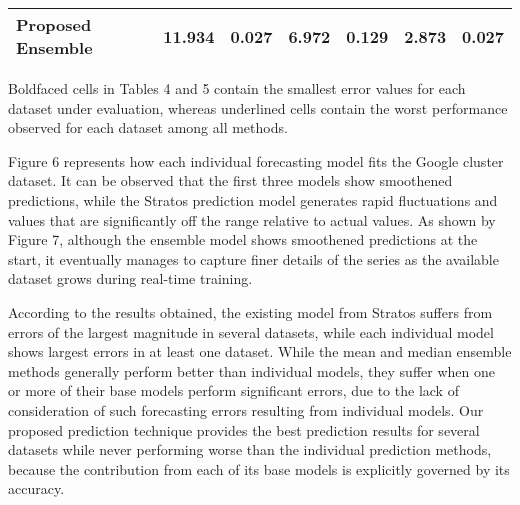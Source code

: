\begin{table}[]
\begin{tabular}{|l|r|r|r|r|r|r|}
Proposed Ensemble                                     & \textbf{11.934}           & \textbf{0.027}            & \textbf{6.972}            & \textbf{0.129}            & 2.873                     & 0.027                     \\ \hline
\end{tabular}
\end{table}

Boldfaced cells in Tables 4 and 5 contain the smallest error values for each dataset under evaluation, whereas underlined cells contain the worst performance observed for each dataset among all methods.

Figure 6 represents how each individual forecasting model fits the Google cluster dataset. It can be observed that the first three models show smoothened predictions, while the Stratos prediction model generates rapid fluctuations and values that are significantly off the range relative to actual values. As shown by Figure 7, although the ensemble model shows smoothened predictions at the start, it eventually manages to capture finer details of the series as the available dataset grows during real-time training.

According to the results obtained, the existing model from Stratos suffers from errors of the largest magnitude in several datasets, while each individual model shows largest errors in at least one dataset.
While the mean and median ensemble methods generally perform better than individual models, they suffer when one or more of their base models perform significant errors, due to the lack of consideration of such forecasting errors resulting from individual models.
Our proposed prediction technique provides the best prediction results for several datasets while never performing worse than the individual prediction methods, because the contribution from each of its base models is explicitly governed by its accuracy.